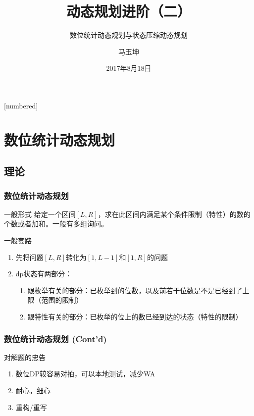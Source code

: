 \documentclass[hyperref={unicode=true}]{beamer}
\theoremstyle{definition}
\theoremstyle{proof}
\begin{document}
[numbered]
\renewcommand\figurename{图}
\renewcommand\tablename{表}
\renewcommand\contentsname{\centering 目录}


\title{动态规划进阶（二）}
\subtitle{数位统计动态规划与状态压缩动态规划}
\author{马玉坤}
\date{2017年8月18日}

\begin{frame}\titlepage\end{frame}

\begin{frame}\tableofcontents\end{frame}

\section{数位统计动态规划}


\subsection{理论}
\begin{frame}\frametitle{数位统计动态规划}
  \begin{block}{一般形式}
    给定一个区间$[L,R]$，求在此区间内满足某个条件限制（特性）的数的个数或者加和。一般有多组询问。
  \end{block}
  \begin{exampleblock}{一般套路}
    \begin{enumerate}[<+->]
    \item 先将问题$[L,R]$转化为$[1,L-1]$和$[1,R]$的问题
    \item dp状态有两部分：
      \begin{enumerate}
      \item 跟枚举有关的部分：已枚举到的位数，以及前若干位数是不是已经到了上限（范围的限制）
      \item 跟特性有关的部分：已枚举的位上的数已经到达的状态（特性的限制）
      \end{enumerate}
    \end{enumerate}
  \end{exampleblock}
\end{frame}
\begin{frame}\frametitle{数位统计动态规划 (Cont'd)}
  \begin{alertblock}{对解题的忠告}
    \begin{enumerate}[<+->]
    \item 数位DP较容易对拍，可以本地测试，减少WA
    \item 耐心，细心
    \item 重构/重写
    \end{enumerate}
  \end{alertblock}
\end{frame}
\end{document}
